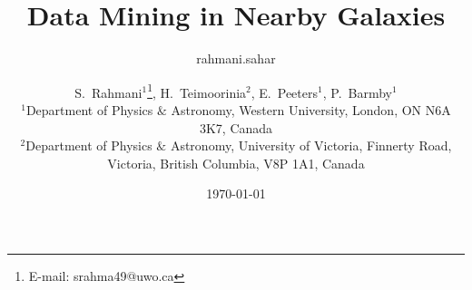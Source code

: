 \documentclass[useAMS,usenatbib]{mn2e}
\begin{document}

\title{Data Mining in Nearby Galaxies}
\author{rahmani.sahar }
\date{\today}
\author[S. Rahmani, et. al.]{S.~Rahmani$^{1}$\thanks{E-mail:
srahma49@uwo.ca}, H.~Teimoorinia$^{2}$, E.~Peeters$^{1}$, P.~Barmby$^{1}$\\
$^{1}$Department of Physics $\&$ Astronomy, Western University, London, ON N6A 3K7, Canada\\
$^{2}$Department of Physics $\&$ Astronomy, University of Victoria, Finnerty Road, Victoria, British Columbia, V8P 1A1, Canada}
\maketitle

\end{document}

